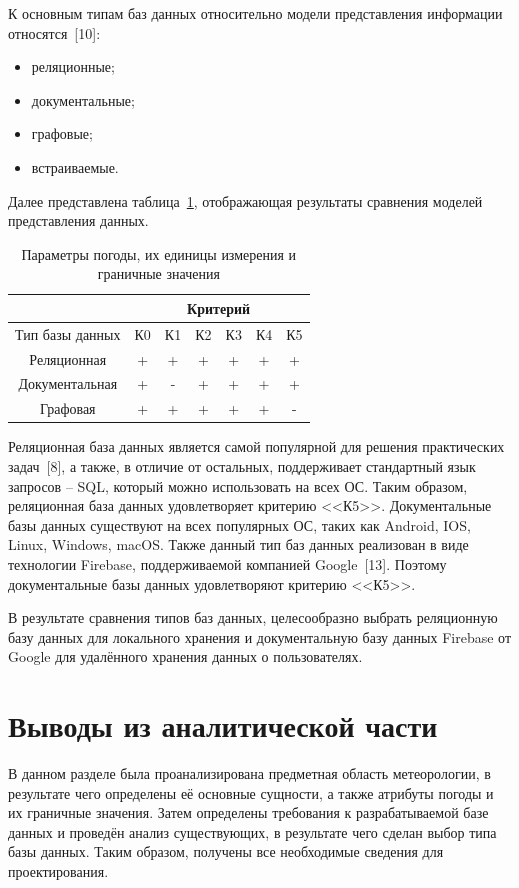 К основным типам баз данных относительно модели представления информации относятся~[10]:
\begin{itemize}
    \item реляционные;
    \item документальные;
    \item графовые;
    \item встраиваемые.
\end{itemize}

Далее представлена таблица~\ref{table:cmp_model}, отображающая результаты сравнения моделей представления данных.
\begin{table}[h!]
    \centering
    \begin{tabular} { |c|c|c|c|c|c|c| }
        \hline
        \hspace{0pt} & \multicolumn{6}{|c|}{Критерий} \\
        \hline
        Тип базы данных & К0 & К1 & К2 & К3 & К4 & К5 \\
        \hline
        Реляционная & + & + & + & + & + & + \\
        \hline
        Документальная & + & - & + & + & + & + \\
        \hline
        Графовая & + & + & + & + & + & - \\
        \hline
        \end{tabular}
    \caption{\centering Параметры погоды, их единицы измерения и граничные значения}
    \label{table:cmp_model}
\end{table}
Реляционная база данных является самой популярной для решения практических задач~[8], а также, в отличие от остальных, поддерживает стандартный язык запросов -- SQL, который можно использовать на всех ОС.
Таким образом, реляционная база данных удовлетворяет критерию <<К5>>.
Документальные базы данных существуют на всех популярных ОС, таких как Android, IOS, Linux, Windows, macOS.
Также данный тип баз данных реализован в виде технологии Firebase, поддерживаемой компанией Google~[13].
Поэтому документальные базы данных удовлетворяют критерию <<К5>>.

В результате сравнения типов баз данных, целесообразно выбрать реляционную базу данных для локального хранения и документальную базу данных Firebase от Google для удалённого хранения данных о пользователях.

\section*{Выводы из аналитической части}
В данном разделе была проанализирована предметная область метеорологии, в результате чего определены её основные сущности, а также атрибуты погоды и их граничные значения.
Затем определены требования к разрабатываемой базе данных и проведён анализ существующих, в результате чего сделан выбор типа базы данных.
Таким образом, получены все необходимые сведения для проектирования.